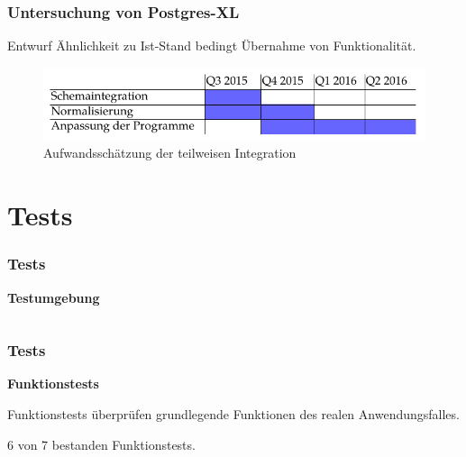 \documentclass{beamer}
\begin{document}
\begin{frame}\frametitle{Untersuchung von Postgres-XL}
\begin{block}{Entwurf}
Ähnlichkeit zu Ist-Stand bedingt Übernahme von Funktionalität.
\end{block}

\begin{figure}
\centering
\includegraphics[width=1\hsize]{../Abbildungen/gantt_aufwand_umsetzung_cropped.pdf}
\caption{Aufwandsschätzung der teilweisen Integration}
\end{figure}
\end{frame}

\section{Tests}

\begin{frame}\frametitle{Tests}
\centering\textbf{Testumgebung}

   \begin{columns}
    \begin{column}{.5\textwidth}

    \end{column}
    \begin{column}{.5\textwidth}
\resizebox{1\linewidth}{!}{}
    \end{column}
  \end{columns}
\end{frame}

\begin{frame}\frametitle{Tests}
\begin{center}
\textbf{Funktionstests}\\
\end{center}

\vspace{\baselineskip}
\vspace{\baselineskip}

Funktionstests überprüfen grundlegende Funktionen des realen Anwendungsfalles.

\vspace{\baselineskip}
\vspace{\baselineskip}

6 von 7 bestanden Funktionstests.
\end{frame}
\end{document}
